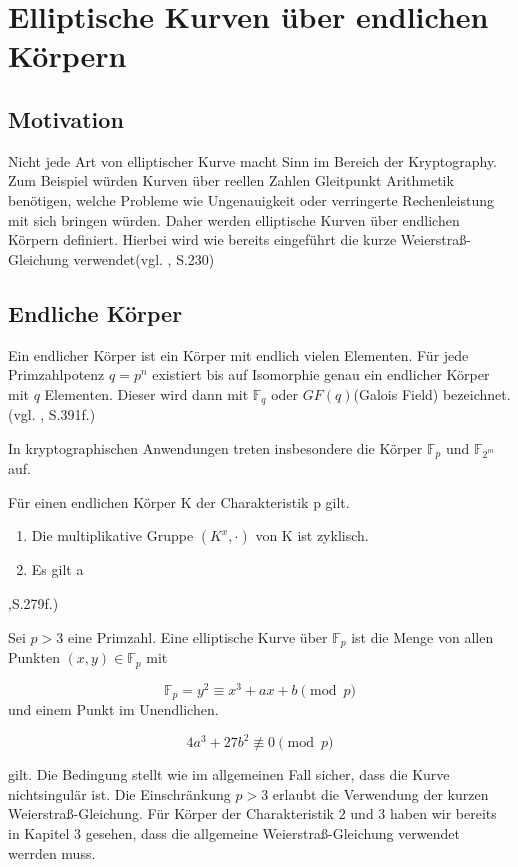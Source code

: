 \chapter{Elliptische Kurven über endlichen Körpern}

\section{Motivation}
  Nicht jede Art von elliptischer Kurve macht Sinn im Bereich der Kryptography. Zum Beispiel würden Kurven über reellen Zahlen Gleitpunkt Arithmetik benötigen, welche Probleme wie Ungenauigkeit oder verringerte Rechenleistung mit sich bringen würden. Daher werden elliptische Kurven über endlichen Körpern definiert.
    Hierbei wird wie bereits eingeführt die kurze Weierstraß-Gleichung verwendet(vgl. \cite{omondi20}, S.230)
    
\section{Endliche Körper}
    \begin{definition}
    Ein endlicher Körper ist ein Körper mit endlich vielen Elementen. Für jede Primzahlpotenz \(q=p^n\) existiert bis auf Isomorphie genau ein endlicher Körper mit \(q\) Elementen. Dieser wird dann mit \(\mathbb F_q\) oder \(GF(q)\)(Galois Field) bezeichnet.
    (vgl. \cite{karpf24}, S.391f.)
    \end{definition}
    In kryptographischen Anwendungen treten insbesondere die Körper \(\mathbb F_p\) und \(\mathbb F_{2^m}\) auf.

    \begin{lemma}
        Für einen endlichen Körper K der Charakteristik p gilt.
        \begin{enumerate}
            \item Die multiplikative Gruppe $(K^x,\cdot)$ von K ist zyklisch.
            \item Es gilt a
        \end{enumerate}
     
    \end{lemma}

    \cite{guneysu24},S.279f.)  
    \begin{definition}
    Sei \(p>3\) eine Primzahl. Eine elliptische Kurve über \(\mathbb F_p\) ist die Menge von allen Punkten $(x,y)\in \mathbb{F}_p$ mit
    
    \[
    \mathbb F_p = y^2 \equiv x^3+ax+b \pmod p
    \]
    und einem Punkt im Unendlichen.

    \[
    4a^3+27b^2 \not\equiv 0 \pmod p
    \]
    
    gilt. Die Bedingung stellt wie im allgemeinen Fall sicher, dass die Kurve nichtsingulär ist. Die Einschränkung $p>3$ erlaubt die Verwendung der kurzen Weierstraß-Gleichung. Für Körper der Charakteristik \(2\) und \(3\) haben wir bereits in Kapitel 3 gesehen, dass die allgemeine Weierstraß-Gleichung verwendet werrden muss.
    \end{definition}

